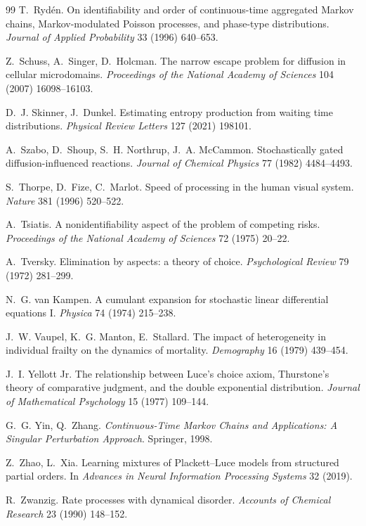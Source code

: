 \documentclass[11pt]{article}
\theoremstyle{remark}
\begin{document}
\begin{thebibliography}{99}
 T.~Ryd\'en. On identifiability and order of
continuous-time aggregated Markov chains, Markov-modulated Poisson processes,
and phase-type distributions. \emph{Journal of Applied Probability} 33 (1996)
640--653.

 Z.~Schuss, A.~Singer, D.~Holcman. The
narrow escape problem for diffusion in cellular microdomains. \emph{Proceedings
of the National Academy of Sciences} 104 (2007) 16098--16103.

 D.~J. Skinner, J.~Dunkel.
Estimating entropy production from waiting time distributions. \emph{Physical
Review Letters} 127 (2021) 198101.

 A.~Szabo, D.~Shoup, S.~H. Northrup,
J.~A. McCammon. Stochastically gated diffusion-influenced reactions.
\emph{Journal of Chemical Physics} 77 (1982) 4484--4493.

 S.~Thorpe, D.~Fize, C.~Marlot.
Speed of processing in the human visual system. \emph{Nature} 381 (1996)
520--522.

 A.~Tsiatis. A nonidentifiability aspect of
the problem of competing risks. \emph{Proceedings of the National Academy of
Sciences} 72 (1975) 20--22.

 A.~Tversky. Elimination by aspects: a
theory of choice. \emph{Psychological Review} 79 (1972) 281--299.

 N.~G. van Kampen. A cumulant expansion
for stochastic linear differential equations I. \emph{Physica} 74 (1974)
215--238.

 J.~W. Vaupel, K.~G. Manton,
E.~Stallard. The impact of heterogeneity in individual frailty on the dynamics
of mortality. \emph{Demography} 16 (1979) 439--454.

 J.~I. Yellott Jr. The relationship between
Luce's choice axiom, Thurstone's theory of comparative judgment, and the double
exponential distribution. \emph{Journal of Mathematical Psychology} 15 (1977)
109--144.

 G.~G. Yin, Q.~Zhang.
\emph{Continuous-Time Markov Chains and Applications: A Singular Perturbation
Approach}. Springer, 1998.

 Z.~Zhao, L.~Xia. Learning mixtures of
Plackett--Luce models from structured partial orders. In \emph{Advances in
Neural Information Processing Systems} 32 (2019).

 R.~Zwanzig. Rate processes with dynamical
disorder. \emph{Accounts of Chemical Research} 23 (1990) 148--152.

\end{thebibliography}
\end{document}
